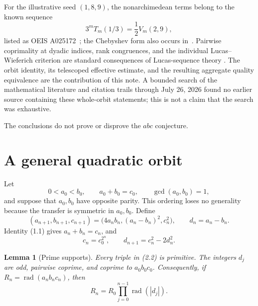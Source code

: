 \documentclass[11pt]{article}
\newtheorem{lemma}[theorem]{Lemma}
\theoremstyle{remark}
\newcommand{\rad}{\operatorname{rad}}
\begin{document}
For the illustrative seed \((1,8,9)\), the nonarchimedean terms belong
to the known sequence
\[
 3^mT_m(1/3)=\frac12V_m(2,9),
\]
listed as OEIS A025172~\cite{OEIS-A025172}; the Chebyshev form also
occurs in~\cite{BajorskaEtAl2019}.  Pairwise coprimality at dyadic
indices, rank congruences, and the individual Lucas--Wieferich criterion
are standard consequences of Lucas-sequence theory
\cite{Ribenboim2001,Sun2013}.  The orbit identity, its telescoped
effective estimate, and the resulting aggregate quality equivalence are
the contribution of this note.  A bounded search of the mathematical
literature and citation trails through July 26, 2026 found no earlier
source containing these whole-orbit statements; this is not a claim that
the search was exhaustive.

The conclusions do not prove or disprove the \(abc\) conjecture.

\section{A general quadratic orbit}

Let
\[
 0<a_0<b_0,\qquad a_0+b_0=c_0,\qquad \gcd(a_0,b_0)=1,
                                                               \tag{2.1}
\]
and suppose that \(a_0,b_0\) have opposite parity.  This ordering loses
no generality because the transfer is symmetric in \(a_0,b_0\).  Define
\[
 (a_{n+1},b_{n+1},c_{n+1})
   =\bigl(4a_nb_n,(a_n-b_n)^2,c_n^2\bigr),\qquad
 d_n=a_n-b_n.                                             \tag{2.2}
\]
Identity (1.1) gives \(a_n+b_n=c_n\), and
\[
 c_n=c_0^{2^n},\qquad d_{n+1}=c_n^2-2d_n^2.               \tag{2.3}
\]

\begin{lemma}[Prime supports]\label{lem:support}
Every triple in (2.2) is primitive.  The integers \(d_j\) are odd,
pairwise coprime, and coprime to \(a_0b_0c_0\).  Consequently, if
\(R_n=\rad(a_nb_nc_n)\), then
\[
 R_n=R_0\prod_{j=0}^{n-1}\rad(|d_j|).                     \tag{2.4}
\]
\end{lemma}
\end{document}
